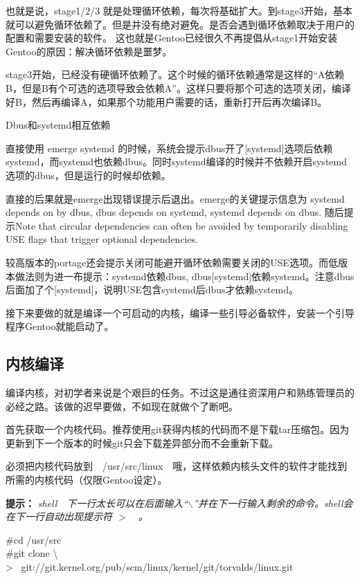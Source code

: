 也就是说，stage1/2/3 就是处理循环依赖，每次将基础扩大。到stage3开始，基本就可以避免循环依赖了。但是并没有绝对避免。是否会遇到循环依赖取决于用户的配置和需要安装的软件。
这也就是Gentoo已经很久不再提倡从stage1开始安装Gentoo的原因：解决循环依赖是噩梦。

stage3开始，已经没有硬循环依赖了。这个时候的循环依赖通常是这样的“A依赖B，但是B有个可选的选项导致会依赖A”。这样只要将那个可选的选项关闭，编译好B，然后再编译A，如果那个功能用户需要的话，重新打开后再次编译B。

\begin{example}{Dbus和systemd相互依赖}

直接使用 emerge systemd 的时候，系统会提示dbus开了[systemd]选项后依赖systemd，而systemd也依赖dbus。同时systemd编译的时候并不依赖开启systemd选项的dbus，但是运行的时候却依赖。

直接的后果就是emerge出现错误提示后退出。emerge的关键提示信息为 systemd depends on by dbus, dbus depends on systemd, systemd depends on dbus.
随后提示Note that circular dependencies can often be avoided by temporarily disabling USE flags that trigger optional dependencies.

较高版本的portage还会提示关闭可能避开循环依赖需要关闭的USE选项。而低版本做法则为进一布提示：systemd依赖dbus, dbus[systemd]依赖systemd。注意dbus后面加了个[systemd]，说明USE包含systemd后dbus才依赖systemd。

\end{example}


接下来要做的就是编译一个可启动的内核，编译一些引导必备软件，安装一个引导程序Gentoo就能启动了。


\subsection{内核编译}
编译内核，对初学者来说是个艰巨的任务。不过这是通往资深用户和熟练管理员的必经之路。该做的迟早要做，不如现在就做个了断吧。

首先获取一个内核代码。推荐使用git获得内核的代码而不是下载tar压缩包。因为更新到下一个版本的时候git只会下载差异部分而不会重新下载。

必须把内核代码放到　/usr/src/linux　哦，这样依赖内核头文件的软件才能找到所需的内核代码（仅限Gentoo设定）。

{
\bf\noindent{} 提示：
}{
\em shell　下一行太长可以在后面输入``$\backslash$''并在下一行输入剩余的命令。shell会在下一行自动出现提示符 $>$　。
}


\begin{code}
\#cd /usr/src\\
\#git clone \textbackslash \\
>~ git://git.kernel.org/pub/scm/linux/kernel/git/torvalds/linux.git
\end{code}

